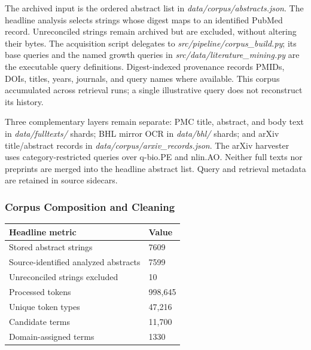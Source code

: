 \documentclass[
]{article}
\newcounter{none} %
\numberwithin{equation}{section}
\begin{document}
The archived input is the ordered abstract list in
\emph{data/corpus/abstracts.json}. The headline analysis selects strings
whose digest maps to an identified PubMed record. Unreconciled strings
remain archived but are excluded, without altering their bytes. The
acquisition script delegates to \emph{src/pipeline/corpus\_build.py};
its base queries and the named growth queries in
\emph{src/data/literature\_mining.py} are the executable query
definitions. Digest-indexed provenance records PMIDs, DOIs, titles,
years, journals, and query names where available. This corpus
accumulated across retrieval runs; a single illustrative query does not
reconstruct its history.

Three complementary layers remain separate: PMC title, abstract, and
body text in \emph{data/fulltexts/} shards; BHL mirror OCR in
\emph{data/bhl/} shards; and arXiv title/abstract records in
\emph{data/corpus/arxiv\_records.json}. The arXiv harvester uses
category-restricted queries over q-bio.PE and nlin.AO. Neither full
texts nor preprints are merged into the headline abstract list. Query
and retrieval metadata are retained in source sidecars.

\subsubsection{Corpus Composition and
Cleaning}\label{corpus-composition-and-cleaning}

{\def\LTcaptype{none} %
\begin{longtable}[]{@{}ll@{}}
\toprule\noalign{}
Headline metric & Value \\
\midrule\noalign{}
\endhead
\bottomrule\noalign{}
\endlastfoot
Stored abstract strings & 7609 \\
Source-identified analyzed abstracts & 7599 \\
Unreconciled strings excluded & 10 \\
Processed tokens & 998,645 \\
Unique token types & 47,216 \\
Candidate terms & 11,700 \\
Domain-assigned terms & 1330 \\
\end{longtable}
}
\end{document}
